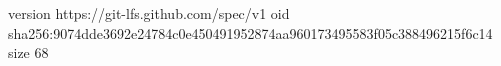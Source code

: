 version https://git-lfs.github.com/spec/v1
oid sha256:9074dde3692e24784c0e450491952874aa960173495583f05c388496215f6c14
size 68
